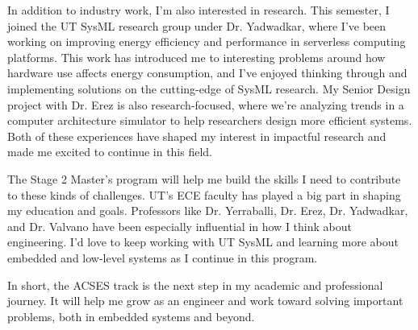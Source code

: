 \documentclass[12pt]{article}
\begin{document}
In addition to industry work, I’m also interested in research. This semester, I joined the UT SysML research group under Dr. Yadwadkar, where I’ve been working on improving energy efficiency and performance in serverless computing platforms. This work has introduced me to interesting problems around how hardware use affects energy consumption, and I’ve enjoyed thinking through and implementing solutions on the cutting-edge of SysML research. My Senior Design project with Dr. Erez is also research-focused, where we’re analyzing trends in a computer architecture simulator to help researchers design more efficient systems. Both of these experiences have shaped my interest in impactful research and made me excited to continue in this field.

The Stage 2 Master’s program will help me build the skills I need to contribute to these kinds of challenges. UT’s ECE faculty has played a big part in shaping my education and goals. Professors like Dr. Yerraballi, Dr. Erez, Dr. Yadwadkar, and Dr. Valvano have been especially influential in how I think about engineering. I’d love to keep working with UT SysML and learning more about embedded and low-level systems as I continue in this program.

In short, the ACSES track is the next step in my academic and professional journey. It will help me grow as an engineer and work toward solving important problems, both in embedded systems and beyond.
\end{document}
